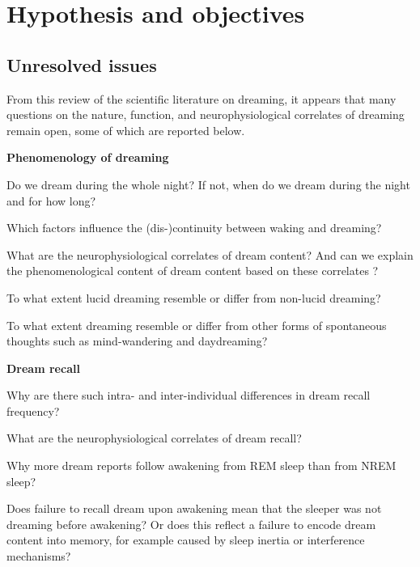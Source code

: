 \cleardoublepage

\chapter{Hypothesis and objectives}
\label{sec:problematic}


\section{Unresolved issues}
\label{sec:problematic:unresolved}

From this review of the scientific literature on dreaming, it appears that many questions on the nature, function, and neurophysiological correlates of dreaming remain open, some of which are reported below.

\textbf{Phenomenology of dreaming}
\begin{my_list_item}
    \item Do we dream during the whole night? If not, when do we dream during the night and for how long?
	\item Which factors influence the (dis-)continuity between waking and dreaming?
	\item What are the neurophysiological correlates of dream content? And can we explain the phenomenological content of dream content based on these correlates ?
	\item To what extent lucid dreaming resemble or differ from non-lucid dreaming?
	\item To what extent dreaming resemble or differ from other forms of spontaneous thoughts such as mind-wandering and daydreaming?
\end{my_list_item}

\textbf{Dream recall}
\begin{my_list_item}
	\item Why are there such intra- and inter-individual differences in dream recall frequency?
	\item What are the neurophysiological correlates of dream recall?
    \item Why more dream reports follow awakening from REM sleep than from NREM sleep?
	\item Does failure to recall dream upon awakening mean that the sleeper was not dreaming before awakening? Or does this reflect a failure to encode dream content into memory, for example caused by sleep inertia or interference mechanisms?
\end{my_list_item}


